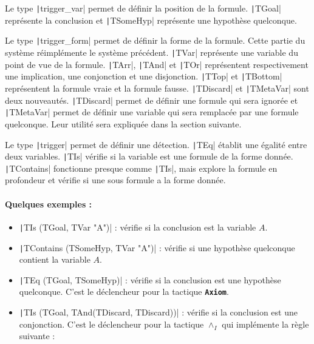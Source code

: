 \documentclass[french,titlepage]{article}
\newcommand{\textttbf}[1]{\texttt{\textbf{#1}}}
\begin{document}
Le type \texttt|trigger_var| permet de définir la position de la formule. \texttt|TGoal| représente la conclusion et \texttt|TSomeHyp| représente une hypothèse quelconque.

Le type \texttt|trigger_form| permet de définir la forme de la formule. Cette partie du système réimplémente le système précédent. \texttt|TVar| représente une variable du point de vue de la formule. \texttt|TArr|, \texttt|TAnd| et \texttt|TOr| représentent respectivement une implication, une conjonction et une disjonction. \texttt|TTop| et \texttt|TBottom| représentent la formule vraie et la formule fausse. \texttt|TDiscard| et \texttt|TMetaVar| sont deux nouveautés. \texttt|TDiscard| permet de définir une formule qui sera ignorée et \texttt|TMetaVar| permet de définir une variable qui sera remplacée par une formule quelconque. Leur utilité sera expliquée dans la section suivante.

Le type \texttt|trigger| permet de définir une détection. \texttt|TEq| établit une égalité entre deux variables. \texttt|TIs| vérifie si la variable est une formule de la forme donnée. \texttt|TContains| fonctionne presque comme \texttt|TIs|, mais explore la formule en profondeur et vérifie si une sous formule a la forme donnée.

\paragraph{Quelques exemples :} \label{realisation:langage_detecter:syntaxe:exemples}
\begin{itemize}
    \item \texttt|TIs (TGoal, TVar "A")| : vérifie si la conclusion est la variable $A$.
    \item \texttt|TContains (TSomeHyp, TVar "A")| : vérifie si une hypothèse quelconque contient la variable $A$.
    \item \texttt|TEq (TGoal, TSomeHyp)| : vérifie si la conclusion est une hypothèse quelconque. C'est le déclencheur pour la tactique \textttbf{Axiom}.
    \item \texttt|TIs (TGoal, TAnd(TDiscard, TDiscard))| :
          vérifie si la conclusion est une conjonction. C'est le déclencheur
          pour la tactique $\land_I$ qui implémente la règle suivante :
          \begin{mathpar}
          \end{mathpar}
\end{itemize}
\end{document}
